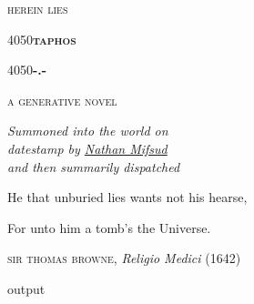 ﻿\documentclass[12pt,a4paper]{report}
\makeatletter
\newcommand\HUGE{\@setfontsize\Huge{40}{50}}
\renewcommand{\sc}[1]{\textsc{\MakeLowercase{#1}}}
\makeatother
\begin{document}
\renewcommand{\baselinestretch}{1.1}\normalsize
\thispagestyle{empty}
\begin{center}
    \vspace*{6em}
    {\Large{\sc{Herein lies}}}
    \par\vspace{2.5em}
    {\HUGE{\sc{\textbf{Taphos}}}}
    \par\vspace{1.5em}
    \setmainfont[RawFeature={+dlig}]{Vollkorn}
    {\HUGE{\textbf{-.-}}}
    \setmainfont[RawFeature={-dlig}]{Vollkorn}
    \par\vspace{6em}
    {\Large{\sc{A generative novel}}}
    \par\vspace{9em}
    {\textit{Summoned into the world on\\
    datestamp by \href{https://github.com/nmifsud/taphos}{Nathan Mifsud}\\
    and then summarily dispatched}}
\end{center}
\newpage

\thispagestyle{empty}
\vspace*{8em}\hspace{2em} He that unburied lies wants not his hearse,

\hspace{2em} For unto him a tomb's the Universe.

\vspace{.5em}\hspace{9em} \sc{Sir Thomas Browne}, \textit{Religio Medici} (1642)
\newpage

\tableofcontents
\renewcommand{\baselinestretch}{1.0}\normalsize
\newpage

\sloppy
output
\end{document}
